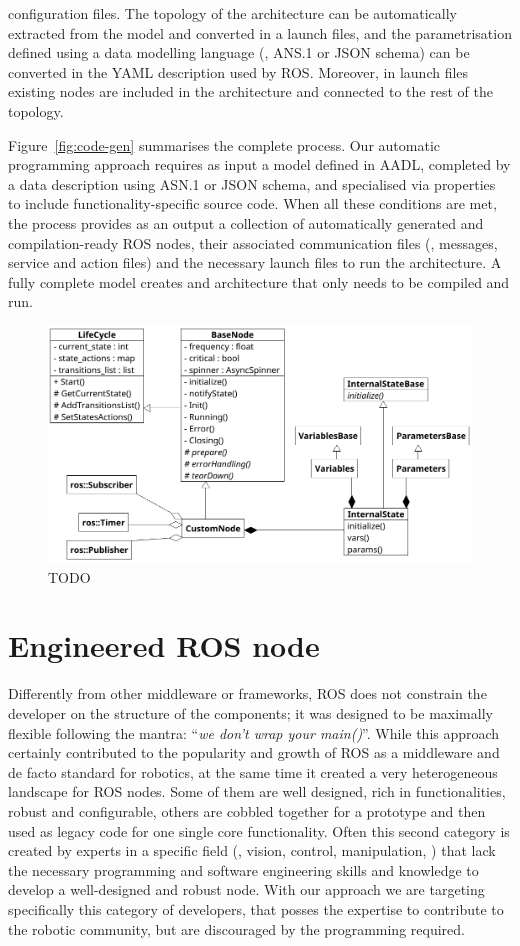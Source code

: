 configuration files. The topology of the architecture can be automatically extracted from the model and converted in a launch files, and the parametrisation defined using a data modelling language (\ie, ANS.1 or JSON schema) can be converted in the YAML description used by ROS. Moreover, in launch files existing nodes are included in the architecture and connected to the rest of the topology.

Figure~\ref{fig:code-gen} summarises the complete process. Our automatic programming approach requires as input a model defined in AADL, completed by a data description using ASN.1 or JSON schema, and specialised via properties to include functionality-specific source code. When all these conditions are met, the process provides as an output a collection of automatically generated and compilation-ready ROS nodes, their associated communication files (\ie, messages, service and action files) and the necessary launch files to run the architecture. A fully complete model creates and architecture that only needs to be compiled and run.

\begin{figure}[t]
    \centering
    \includegraphics[width=\textwidth]{gfx/class}
    \caption{TODO}\label{fig:node-class}
\end{figure}

\section{Engineered ROS node}
\label{sec:ros-node}
Differently from other middleware or frameworks, ROS does not constrain the developer on the structure of the components; it was designed to be maximally flexible following the mantra: ``\textit{we don't wrap your main()}''. While this approach certainly contributed to the popularity and growth of ROS as a middleware and de facto standard for robotics, at the same time it created a very heterogeneous landscape for ROS nodes. Some of them are well designed, rich in functionalities, robust and configurable, others are cobbled together for a prototype and then used as legacy code for one single core functionality. Often this second category is created by experts in a specific field (\eg, vision, control, manipulation, \etc) that lack the necessary programming and software engineering skills and knowledge to develop a well-designed and robust node. With our approach we are targeting specifically this category of developers, that posses the expertise to contribute to the robotic community, but are discouraged by the programming required.

